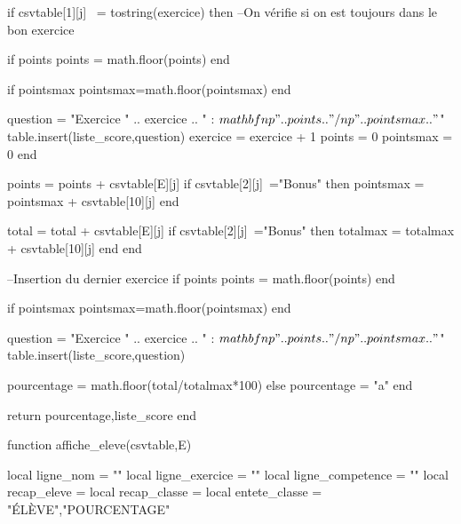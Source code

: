\documentclass[fiche]{classe-tex3R}
\begin{document}
\begin{luacode*}
                if csvtable[1][j] ~= tostring(exercice) then --On vérifie si on est toujours dans le bon exercice
    
                    if points%
                    points = math.floor(points)
                    end
    
                    if pointsmax%
                        pointsmax=math.floor(pointsmax)
                    end
    
                    question = "Exercice " .. exercice .. " : $\\mathbf{\\np{" .. points .. "}/\\np{" .. pointsmax .. "}}$"
                    table.insert(liste_score,question)
                    exercice = exercice + 1
                    points = 0
                    pointsmax = 0
                end
    
                points = points + csvtable[E][j]
                if csvtable[2][j]~="Bonus" then
                    pointsmax = pointsmax + csvtable[10][j]
                end
    
                total = total + csvtable[E][j]
                if csvtable[2][j]~="Bonus" then
                    totalmax = totalmax + csvtable[10][j]
                end
            end
    
            --Insertion du dernier exercice
            if points%
                points = math.floor(points)
            end
    
            if pointsmax%
                pointsmax=math.floor(pointsmax)
            end
    
            question = "Exercice " .. exercice .. " : $\\mathbf{\\np{" .. points .. "}/\\np{" .. pointsmax .. "}}$"
            table.insert(liste_score,question)
    
            pourcentage = math.floor(total/totalmax*100)
        else
            pourcentage = "a"
        end
    
        return pourcentage,liste_score
    end
    
    function affiche_eleve(csvtable,E)
       
        local ligne_nom = ""
        local ligne_exercice = ""
        local ligne_competence = ""
        local recap_eleve = {}
        local recap_classe = {}
        local entete_classe = {"ÉLÈVE","POURCENTAGE"}
    

\end{luacode*}
\end{document}

